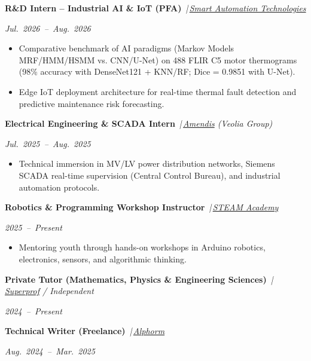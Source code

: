 \documentclass[10pt, a4paper]{article}
\newcommand{\experience}[3]{%
    \noindent
    \parbox[t]{0.72\textwidth}{\textbf{#1} \textit{\,|\,#2}}%
    \hfill
    \parbox[t]{0.26\textwidth}{\raggedleft\normalfont\itshape\mbox{#3}}%
    \par\vspace{0.2ex}
}
\begin{document}
\experience{R\&D Intern -- Industrial AI \& IoT (PFA)}{\href{https://www.linkedin.com/company/smart-automation-technologies/home/}{Smart Automation Technologies}}{Jul. 2026 -- Aug. 2026}
\begin{itemize}
	\item Comparative benchmark of AI paradigms (Markov Models MRF/HMM/HSMM vs. CNN/U-Net) on 488 FLIR C5 motor thermograms (98\% accuracy with DenseNet121 + KNN/RF; Dice = 0.9851 with U-Net).
	\item Edge IoT deployment architecture for real-time thermal fault detection and predictive maintenance risk forecasting.
\end{itemize}

\experience{Electrical Engineering \& SCADA Intern}{\href{https://www.amendis.ma/}{Amendis} (Veolia Group)}{Jul. 2025 -- Aug. 2025}
\begin{itemize}
	\item Technical immersion in MV/LV power distribution networks, Siemens SCADA real-time supervision (Central Control Bureau), and industrial automation protocols.
\end{itemize}

\experience{Robotics \& Programming Workshop Instructor}{\href{https://www.facebook.com/steamacademy.ma/}{STEAM Academy}}{2025 -- Present}
\begin{itemize}
	\item Mentoring youth through hands-on workshops in Arduino robotics, electronics, sensors, and algorithmic thinking.
\end{itemize}

\experience{Private Tutor (Mathematics, Physics \& Engineering Sciences)}{\href{https://www.superprof.ma/}{Superprof} / Independent}{2024 -- Present}

\experience{Technical Writer (Freelance)}{\href{https://www.alphorm.com/}{Alphorm}}{Aug. 2024 -- Mar. 2025}

\end{document}
